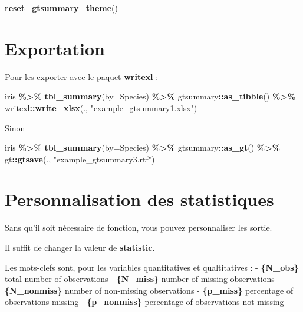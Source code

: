 \documentclass[
]{book}
\newenvironment{Shaded}{\begin{snugshade}}{\end{snugshade}}
\newcommand{\AttributeTok}[1]{\textcolor[rgb]{0.13,0.29,0.53}{#1}}
\newcommand{\FunctionTok}[1]{\textcolor[rgb]{0.13,0.29,0.53}{\textbf{#1}}}
\newcommand{\NormalTok}[1]{#1}
\newcommand{\SpecialCharTok}[1]{\textcolor[rgb]{0.81,0.36,0.00}{\textbf{#1}}}
\newcommand{\StringTok}[1]{\textcolor[rgb]{0.31,0.60,0.02}{#1}}
\begin{document}
\begin{Shaded}
\begin{Highlighting}[]
\FunctionTok{reset\_gtsummary\_theme}\NormalTok{()}
\end{Highlighting}
\end{Shaded}

\section{Exportation}\label{exportation}

Pour les exporter avec le paquet \textbf{writexl} :

\begin{Shaded}
\begin{Highlighting}[]
\NormalTok{iris }\SpecialCharTok{\%\textgreater{}\%} \FunctionTok{tbl\_summary}\NormalTok{(}\AttributeTok{by=}\NormalTok{Species) }\SpecialCharTok{\%\textgreater{}\%}
\NormalTok{  gtsummary}\SpecialCharTok{::}\FunctionTok{as\_tibble}\NormalTok{() }\SpecialCharTok{\%\textgreater{}\%} 
\NormalTok{  writexl}\SpecialCharTok{::}\FunctionTok{write\_xlsx}\NormalTok{(., }\StringTok{"example\_gtsummary1.xlsx"}\NormalTok{)}
\end{Highlighting}
\end{Shaded}

Sinon

\begin{Shaded}
\begin{Highlighting}[]
\NormalTok{iris }\SpecialCharTok{\%\textgreater{}\%} \FunctionTok{tbl\_summary}\NormalTok{(}\AttributeTok{by=}\NormalTok{Species) }\SpecialCharTok{\%\textgreater{}\%}
\NormalTok{  gtsummary}\SpecialCharTok{::}\FunctionTok{as\_gt}\NormalTok{() }\SpecialCharTok{\%\textgreater{}\%} 
\NormalTok{  gt}\SpecialCharTok{::}\FunctionTok{gtsave}\NormalTok{(., }\StringTok{"example\_gtsummary3.rtf"}\NormalTok{)}
\end{Highlighting}
\end{Shaded}

\section{Personnalisation des statistiques}\label{personnalisation-des-statistiques}

Sans qu'il soit nécessaire de fonction, vous pouvez personnaliser les sortie.

Il suffit de changer la valeur de \textbf{statistic}.

Les mots-clefs sont, pour les variables quantitatives et qualtitatives :
- \textbf{\{N\_obs\}} total number of observations
- \textbf{\{N\_miss\}} number of missing observations
- \textbf{\{N\_nonmiss\}} number of non-missing observations
- \textbf{\{p\_miss\}} percentage of observations missing
- \textbf{\{p\_nonmiss\}} percentage of observations not missing
\end{document}
